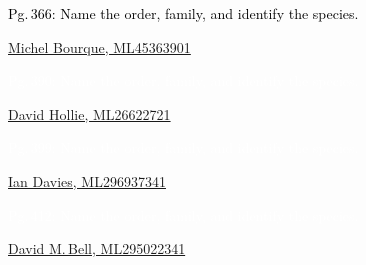 \documentclass[t]{beamer}
\begin{document}
{
	\begin{frame}[t]{\textcolor{black}{Pg.\,366: Name the order, family, and identify the species.}}
		
		\tinyfill  \textcolor{white}{\href{https://macaulaylibrary.org/asset/45363901}{Michel Bourque, ML45363901}}
	\end{frame}
}

{
	\begin{frame}[t]{\textcolor{white}{Pg.\,390: Name the order, family, and identify the species.}}
		
		\tinyfill  \textcolor{white}{\href{https://macaulaylibrary.org/asset/26622721}{David Hollie, ML26622721}}
	\end{frame}
}


{
	\begin{frame}[t]{\textcolor{white}{Pg.\,399: Name the order, family, and identify the species.}}
		
		\tinyfill  \textcolor{black}{\href{https://macaulaylibrary.org/asset/296937341}{Ian Davies, ML296937341}}
	\end{frame}
}


{
	\begin{frame}[t]{\textcolor{white}{Pg.\,412: Name the order, family, and identify the species.}}
		
		\tinyfill  \textcolor{white}{\href{https://macaulaylibrary.org/asset/295022341}{David M.\,Bell, ML295022341}}
	\end{frame}
}
\end{document}
